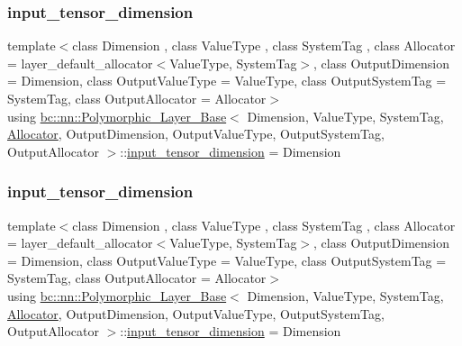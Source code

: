 \subsubsection{\texorpdfstring{input\+\_\+tensor\+\_\+dimension}{input\_tensor\_dimension}\hspace{0.1cm}{\footnotesize\ttfamily [1/2]}}
{\footnotesize\ttfamily template$<$class Dimension , class Value\+Type , class System\+Tag , class Allocator  = layer\+\_\+default\+\_\+allocator$<$\+Value\+Type, System\+Tag$>$, class Output\+Dimension  = Dimension, class Output\+Value\+Type  = Value\+Type, class Output\+System\+Tag  = System\+Tag, class Output\+Allocator  = Allocator$>$ \\
using \hyperlink{structbc_1_1nn_1_1Polymorphic__Layer__Base}{bc\+::nn\+::\+Polymorphic\+\_\+\+Layer\+\_\+\+Base}$<$ Dimension, Value\+Type, System\+Tag, \hyperlink{classbc_1_1allocators_1_1Allocator}{Allocator}, Output\+Dimension, Output\+Value\+Type, Output\+System\+Tag, Output\+Allocator $>$\+::\hyperlink{structbc_1_1nn_1_1Polymorphic__Layer__Base_a9cf367e8f043b3bc7ac8ce8f5aeaa832}{input\+\_\+tensor\+\_\+dimension} =  Dimension}

\mbox{\label{structbc_1_1nn_1_1Polymorphic__Layer__Base_a9cf367e8f043b3bc7ac8ce8f5aeaa832}} 
\subsubsection{\texorpdfstring{input\+\_\+tensor\+\_\+dimension}{input\_tensor\_dimension}\hspace{0.1cm}{\footnotesize\ttfamily [2/2]}}
{\footnotesize\ttfamily template$<$class Dimension , class Value\+Type , class System\+Tag , class Allocator  = layer\+\_\+default\+\_\+allocator$<$\+Value\+Type, System\+Tag$>$, class Output\+Dimension  = Dimension, class Output\+Value\+Type  = Value\+Type, class Output\+System\+Tag  = System\+Tag, class Output\+Allocator  = Allocator$>$ \\
using \hyperlink{structbc_1_1nn_1_1Polymorphic__Layer__Base}{bc\+::nn\+::\+Polymorphic\+\_\+\+Layer\+\_\+\+Base}$<$ Dimension, Value\+Type, System\+Tag, \hyperlink{classbc_1_1allocators_1_1Allocator}{Allocator}, Output\+Dimension, Output\+Value\+Type, Output\+System\+Tag, Output\+Allocator $>$\+::\hyperlink{structbc_1_1nn_1_1Polymorphic__Layer__Base_a9cf367e8f043b3bc7ac8ce8f5aeaa832}{input\+\_\+tensor\+\_\+dimension} =  Dimension}

